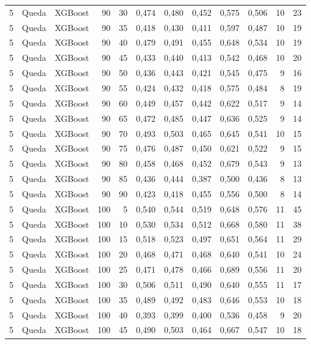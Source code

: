 \begin{longtable}{@{}rllrrrrrrrrr@{}}
5 & Queda & XGBoost & 90 & 30 & 0,474 & 0,480 & 0,452 & 0,575 & 0,506 & 10 & 23 \\
5 & Queda & XGBoost & 90 & 35 & 0,418 & 0,430 & 0,411 & 0,597 & 0,487 & 10 & 19 \\
5 & Queda & XGBoost & 90 & 40 & 0,479 & 0,491 & 0,455 & 0,648 & 0,534 & 10 & 19 \\
5 & Queda & XGBoost & 90 & 45 & 0,433 & 0,440 & 0,413 & 0,542 & 0,468 & 10 & 20 \\
5 & Queda & XGBoost & 90 & 50 & 0,436 & 0,443 & 0,421 & 0,545 & 0,475 & 9 & 16 \\
5 & Queda & XGBoost & 90 & 55 & 0,424 & 0,432 & 0,418 & 0,575 & 0,484 & 8 & 19 \\
5 & Queda & XGBoost & 90 & 60 & 0,449 & 0,457 & 0,442 & 0,622 & 0,517 & 9 & 14 \\
5 & Queda & XGBoost & 90 & 65 & 0,472 & 0,485 & 0,447 & 0,636 & 0,525 & 9 & 14 \\
5 & Queda & XGBoost & 90 & 70 & 0,493 & 0,503 & 0,465 & 0,645 & 0,541 & 10 & 15 \\
5 & Queda & XGBoost & 90 & 75 & 0,476 & 0,487 & 0,450 & 0,621 & 0,522 & 9 & 15 \\
5 & Queda & XGBoost & 90 & 80 & 0,458 & 0,468 & 0,452 & 0,679 & 0,543 & 9 & 13 \\
5 & Queda & XGBoost & 90 & 85 & 0,436 & 0,444 & 0,387 & 0,500 & 0,436 & 8 & 13 \\
5 & Queda & XGBoost & 90 & 90 & 0,423 & 0,418 & 0,455 & 0,556 & 0,500 & 8 & 14 \\
5 & Queda & XGBoost & 100 & 5 & 0,540 & 0,544 & 0,519 & 0,648 & 0,576 & 11 & 45 \\
5 & Queda & XGBoost & 100 & 10 & 0,530 & 0,534 & 0,512 & 0,668 & 0,580 & 11 & 38 \\
5 & Queda & XGBoost & 100 & 15 & 0,518 & 0,523 & 0,497 & 0,651 & 0,564 & 11 & 29 \\
5 & Queda & XGBoost & 100 & 20 & 0,468 & 0,471 & 0,468 & 0,640 & 0,541 & 10 & 24 \\
5 & Queda & XGBoost & 100 & 25 & 0,471 & 0,478 & 0,466 & 0,689 & 0,556 & 11 & 20 \\
5 & Queda & XGBoost & 100 & 30 & 0,506 & 0,511 & 0,490 & 0,640 & 0,555 & 11 & 17 \\
5 & Queda & XGBoost & 100 & 35 & 0,489 & 0,492 & 0,483 & 0,646 & 0,553 & 10 & 18 \\
5 & Queda & XGBoost & 100 & 40 & 0,393 & 0,399 & 0,400 & 0,536 & 0,458 & 9 & 20 \\
5 & Queda & XGBoost & 100 & 45 & 0,490 & 0,503 & 0,464 & 0,667 & 0,547 & 10 & 18 \\

\end{longtable}
